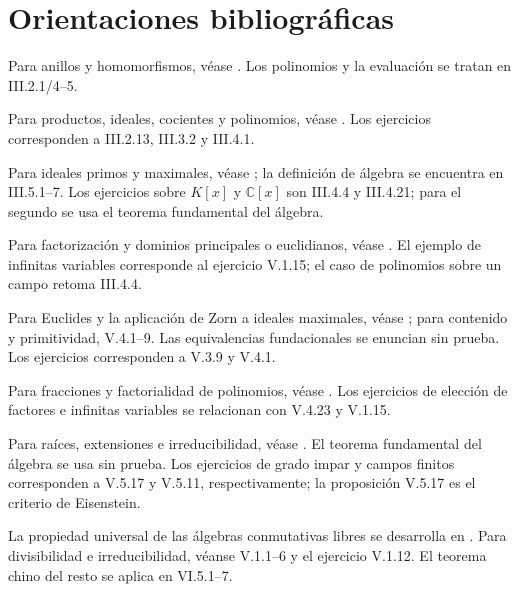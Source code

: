 \section*{Orientaciones bibliográficas}
Para anillos y homomorfismos, véase \citet[cap.~III, 1.1/2/5/8--15/19 y 2.1--3]{aluffi2009}. Los polinomios y la evaluación se tratan en III.2.1/4--5.

Para productos, ideales, cocientes y polinomios, véase \citet[cap.~III, 2.4--7, 3.1/3/8--11 y 4.1--6]{aluffi2009}. Los ejercicios corresponden a III.2.13, III.3.2 y III.4.1.

Para ideales primos y maximales, véase \citet[cap.~III, 4.6--7/9--14]{aluffi2009}; la definición de álgebra se encuentra en III.5.1--7. Los ejercicios sobre $K[x]$ y $\mathbb C[x]$ son III.4.4 y III.4.21; para el segundo se usa el teorema fundamental del álgebra.

Para factorización y dominios principales o euclidianos, véase \citet[cap.~V, 1.7--12 y 2.1--8]{aluffi2009}. El ejemplo de infinitas variables corresponde al ejercicio V.1.15; el caso de polinomios sobre un campo retoma III.4.4.

Para Euclides y la aplicación de Zorn a ideales maximales, véase \citet[cap.~V, 2.9--12 y 3.1/3/5]{aluffi2009}; para contenido y primitividad, V.4.1--9. Las equivalencias fundacionales se enuncian sin prueba. Los ejercicios corresponden a V.3.9 y V.4.1.

Para fracciones y factorialidad de polinomios, véase \citet[cap.~V, 4.10--18]{aluffi2009}. Los ejercicios de elección de factores e infinitas variables se relacionan con V.4.23 y V.1.15.

Para raíces, extensiones e irreducibilidad, véase \citet[cap.~V, apartados 5.1--4 y resultados 5.1--17]{aluffi2009}. El teorema fundamental del álgebra se usa sin prueba. Los ejercicios de grado impar y campos finitos corresponden a V.5.17 y V.5.11, respectivamente; la proposición V.5.17 es el criterio de Eisenstein.

La propiedad universal de las álgebras conmutativas libres se desarrolla en \citet[cap.~III, 5.18 y apartados 6.1--3]{aluffi2009}. Para divisibilidad e irreducibilidad, véanse V.1.1--6 y el ejercicio V.1.12. El teorema chino del resto se aplica en VI.5.1--7.
